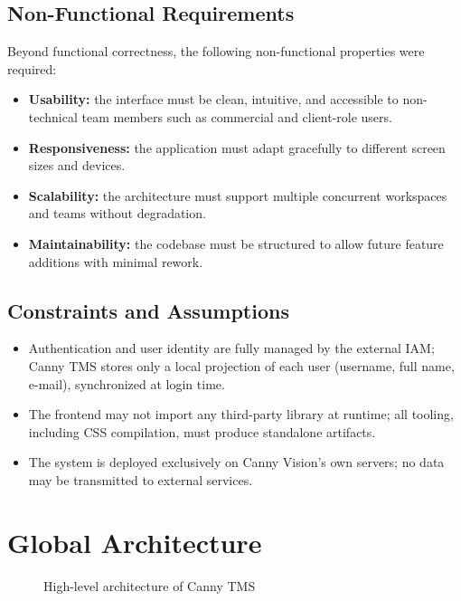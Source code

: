 \subsection{Non-Functional Requirements}

Beyond functional correctness, the following non-functional properties were required:
\begin{itemize}
    \item \textbf{Usability:} the interface must be clean, intuitive, and accessible to
          non-technical team members such as commercial and client-role users.
    \item \textbf{Responsiveness:} the application must adapt gracefully to different
          screen sizes and devices.
    \item \textbf{Scalability:} the architecture must support multiple concurrent workspaces
          and teams without degradation.
    \item \textbf{Maintainability:} the codebase must be structured to allow future feature
          additions with minimal rework.
\end{itemize}

\subsection{Constraints and Assumptions}

\begin{itemize}
    \item Authentication and user identity are fully managed by the external IAM; Canny TMS
          stores only a local projection of each user (username, full name, e-mail),
          synchronized at login time.
    \item The frontend may not import any third-party library at runtime; all tooling,
          including CSS compilation, must produce standalone artifacts.
    \item The system is deployed exclusively on Canny Vision's own servers; no data may
          be transmitted to external services.
\end{itemize}

\section{Global Architecture}

\begin{figure}[H]
    \centering
    
    \caption{High-level architecture of Canny TMS}
    \label{fig:architecture-overview}
\end{figure}

